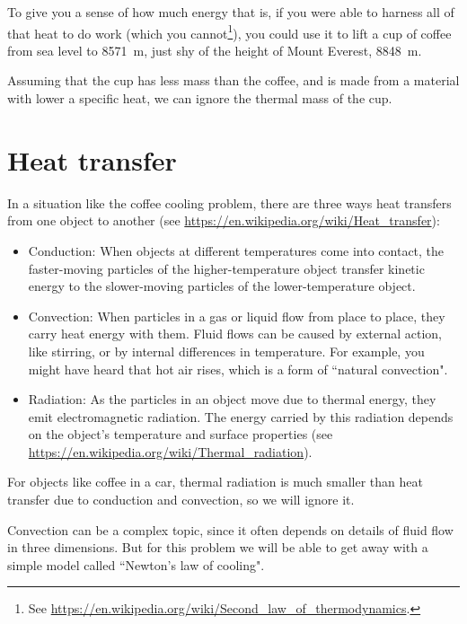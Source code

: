 \documentclass[12pt]{book}
\theoremstyle{exercise}
\begin{document}
To give you a sense of how much energy that is, if you were able to harness all of that heat to do work (which you cannot\footnote{See \url{https://en.wikipedia.org/wiki/Second_law_of_thermodynamics}.}), you could use it to lift a cup of coffee from sea level to \SI{8571}{\meter}, just shy of the height of Mount Everest, \SI{8848}{\meter}.

Assuming that the cup has less mass than the coffee, and is made from a material with lower a specific heat, we can ignore the thermal mass of the cup.


\section{Heat transfer}

In a situation like the coffee cooling problem, there are three ways heat transfers from one object to another (see \url{https://en.wikipedia.org/wiki/Heat_transfer}):

\begin{itemize}

\item Conduction: When objects at different temperatures come into contact, the faster-moving particles of the higher-temperature object transfer kinetic energy to the slower-moving particles of the lower-temperature object.

\item Convection: When particles in a gas or liquid flow from place to place, they carry heat energy with them.  Fluid flows can be caused by external action, like stirring, or by internal differences in temperature.  For example, you might have heard that hot air rises, which is a form of ``natural convection".

\item Radiation: As the particles in an object move due to thermal energy, they emit electromagnetic radiation.  The energy carried by this radiation depends on the object's temperature and surface properties (see \url{https://en.wikipedia.org/wiki/Thermal_radiation}).

\end{itemize}

For objects like coffee in a car, thermal radiation is much smaller than 
heat transfer due to conduction and convection, so we will ignore it.

Convection can be a complex topic, since it often depends on details of fluid flow in three dimensions.  But for this problem we will be able to get away with a simple model called ``Newton's law of cooling".
\end{document}
